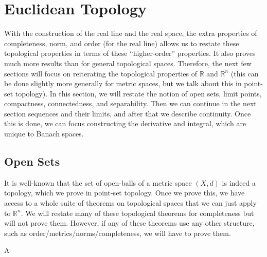 \section{Euclidean Topology} 

    With the construction of the real line and the real space, the extra properties of completeness, norm, and order (for the real line) allows us to restate these topological properties in terms of these ``higher-order'' properties. It also proves much more results than for general topological spaces. Therefore, the next few sections will focus on reiterating the topological properties of $\mathbb{R}$ and $\mathbb{R}^n$ (this can be done slightly more generally for metric spaces, but we talk about this in point-set topology). In this section, we will restate the notion of open sets, limit points, compactness, connectedness, and separability. Then we can continue in the next section sequences and their limits, and after that we describe continuity. Once this is done, we can focus constructing the derivative and integral, which are unique to Banach spaces.  

  \subsection{Open Sets} 

      It is well-known that the set of open-balls of a metric space $(X, d)$ is indeed a topology, which we prove in point-set topology. Once we prove this, we have access to a whole suite of theorems on topological spaces that we can just apply to $\mathbb{R}^n$. We will restate many of these topological theorems for completeness but will not prove them. However, if any of these theorems use any other structure, such as order/metrics/norms/completeness, we will have to prove them. 

      \begin{definition}[Topology]
        A 
      \end{definition}

